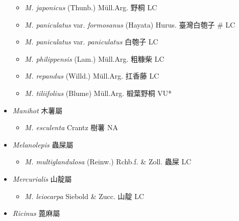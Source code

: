 \begin{itemize}
  \begin{itemize}
        \item[] \textit{M. japonicus} (Thunb.) Müll.Arg.  野桐   LC
        \item[] \textit{M. paniculatus} var. \textit{formosanus} (Hayata) Hurus.  臺灣白匏子  \# LC
        \item[] \textit{M. paniculatus} var. \textit{paniculatus}   白匏子   LC
        \item[] \textit{M. philippensis} (Lam.) Müll.Arg.  粗糠柴   LC
        \item[] \textit{M. repandus} (Willd.) Müll.Arg.  扛香藤   LC
        \item[] \textit{M. tiliifolius} (Blume) Müll.Arg.  椴葉野桐   VU*
  \end{itemize}
 \item[] \textit{Manihot} 木薯屬
                                
  \begin{itemize}
        \item[] \textit{M. esculenta} Crantz  樹薯   NA
  \end{itemize}
 \item[] \textit{Melanolepis} 蟲屎屬
                                
  \begin{itemize}
        \item[] \textit{M. multiglandulosa} (Reinw.) Rchb.f. \& Zoll.  蟲屎   LC
  \end{itemize}
 \item[] \textit{Mercurialis} 山靛屬
                                
  \begin{itemize}
        \item[] \textit{M. leiocarpa} Siebold \& Zucc.  山靛   LC
  \end{itemize}
 \item[] \textit{Ricinus} 蓖麻屬
                                

\end{itemize}
